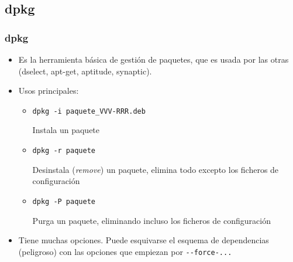 \documentclass[ucs]{beamer}
\begin{document}
\subsection{dpkg}

\begin{frame}[fragile]
\frametitle{dpkg}

\begin{itemize}
\item Es la herramienta básica de gestión de paquetes, que es usada
  por las otras (dselect, apt-get, aptitude, synaptic).
\item Usos principales:
  \begin{itemize}
  \item 
\verb|dpkg -i paquete_VVV-RRR.deb|

Instala un paquete
  \item 
\verb|dpkg -r paquete|

Desinstala  (\emph{remove}) un paquete, elimina todo excepto los ficheros de configuración
  \item 
\verb|dpkg -P paquete| 

Purga un paquete, eliminando incluso los ficheros de configuración
  \end{itemize}
\item Tiene muchas opciones. Puede esquivarse el esquema de
  dependencias (peligroso) con las opciones que empiezan por
  \verb|--force-...|
\end{itemize}

\end{frame}
\end{document}
